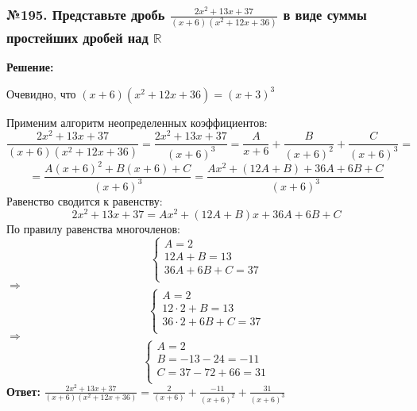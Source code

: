 \documentclass[a4paper]{article}
\begin{document}
\subsubsection*{№195. Представьте дробь $\frac{2x^2+13x+37}{(x+6)(x^2+12x+36)}$ в виде суммы простейших дробей над $\mathbb{R}$}
\textbf{Решение:} \par
Очевидно, что $(x+6)(x^2+12x+36)=(x+3)^3$ \par
Применим алгоритм неопределенных коэффициентов: 
\[\frac{2x^2+13x+37}{(x+6)(x^2+12x+36)}=\frac{2x^2+13x+37}{(x+6)^3}=\frac{A}{x+6}+\frac{B}{(x+6)^2}+\frac{C}{(x+6)^3}=\]
\[=\frac{A(x+6)^2+B(x+6)+C}{(x+6)^3}=\frac{Ax^2+(12A+B)+36A+6B+C}{(x+6)^3}\]
Равенство сводится к равенству:
\[2x^2+13x+37=Ax^2+(12A+B)x+36A+6B+C\]
По правилу равенства многочленов:
\begin{equation*}
 \begin{cases}
	A=2 \\
	12A+B=13 \\
	36A+6B+C=37 \\
 \end{cases}
\end{equation*}
$\Rightarrow$
\begin{equation*}
 \begin{cases}
	A=2 \\
	12\cdot2+B=13 \\
	36\cdot2+6B+C=37 \\
 \end{cases}
\end{equation*}
$\Rightarrow$
\begin{equation*}
 \begin{cases}
	A=2 \\
	B = -13-24=-11 \\
	C = 37-72+66=31 \\
 \end{cases}
\end{equation*}
\textbf{Ответ:} $\frac{2x^2+13x+37}{(x+6)(x^2+12x+36)}=\frac{2}{(x+6)}+\frac{-11}{(x+6)^2}+\frac{31}{(x+6)^3}$

\end{document}
